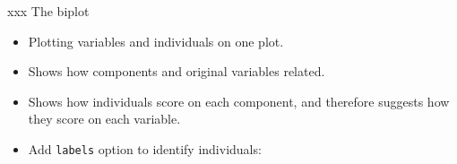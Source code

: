 \documentclass[ignorenonframetext,]{beamer}
\newenvironment{Shaded}{\begin{snugshade}}{\end{snugshade}}
\newcommand{\DataTypeTok}[1]{\textcolor[rgb]{0.13,0.29,0.53}{#1}}
\newcommand{\KeywordTok}[1]{\textcolor[rgb]{0.13,0.29,0.53}{\textbf{#1}}}
\newcommand{\NormalTok}[1]{#1}
\newcommand{\OperatorTok}[1]{\textcolor[rgb]{0.81,0.36,0.00}{\textbf{#1}}}
\newcommand{\StringTok}[1]{\textcolor[rgb]{0.31,0.60,0.02}{#1}}
\begin{document}
\begin{frame}[fragile]{xxx The biplot}
\protect\hypertarget{xxx-the-biplot}{}

\begin{itemize}
\item
  Plotting variables and individuals on one plot.
\item
  Shows how components and original variables related.
\item
  Shows how individuals score on each component, and therefore suggests
  how they score on each variable.
\item
  Add \texttt{labels} option to identify individuals:
\end{itemize}

\begin{Shaded}
\end{Shaded}

\end{frame}
\end{document}
